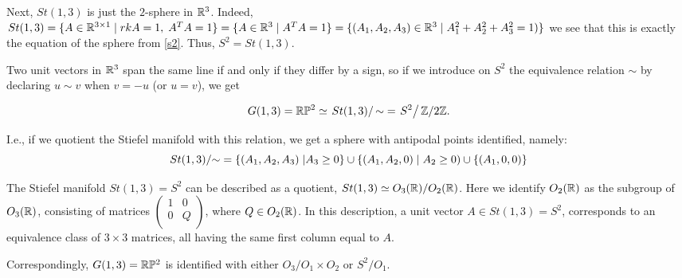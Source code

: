 \documentclass[11pt,a4paper]{report}
\begin{document}
      Next, $St(1,3)$ is just the $2$-sphere in $\mathbb{R}^3$.
%
%
%
      Indeed, $St(1,3) = \{ A \in \mathbb{R}^{3 \times 1} \; | \; rkA=1, \; A^T A = 1 \} = \{ A \in \mathbb{R}^3 \; | \; A^T A = 1 \} = 
\{ (A_1, A_2, A_3) \in \mathbb{R}^3 \; | \; A_1^2 + A_2^2 + A_3^2 = 1) \} $ 
we see that this is exactly the equation of the sphere from \ref{s2}. Thus, $S^2=St(1,3)$.


      Two unit vectors in $\mathbb{R}^3$ span the same line if and only if they differ by a sign, so if we introduce on $S^2$
      the equivalence relation $\sim$ by declaring $u\sim v$ when $v=-u$ (or $u=v$), we get
      
      \[
      	 G(1,3)= \mathbb{R}\mathbb{P}^2 \simeq \left. St(1,3)\right/{\sim}= \left. S^2\right/{\mathbb{Z}/2\mathbb{Z}}.
      \]

      
I.e., if we quotient the Stiefel manifold with this relation, we get a sphere with antipodal points identified, namely: 
$$ St(1,3)/{\sim} = \{ (A_1, A_2, A_3) \; | A_3 \geq 0 \} \cup \{ (A_1, A_2, 0) \; | \; A_2 \geq 0) \cup \{ (A_1, 0, 0) \}  $$

	
	The Stiefel manifold $St(1,3)=S^2$ can be described as a quotient, $St(1,3)\simeq O_3(\mathbb{R})/O_2(\mathbb{R})$. Here
	we identify $O_2(\mathbb{R})$ as the subgroup of $O_3(\mathbb{R})$, consisting of matrices $\begin{pmatrix}
	                                                                               	1&0\\
	                                                                               	0&Q\\
	                                                                               \end{pmatrix}$,
	where $Q\in O_2(\mathbb{R})$. In this description, a unit vector $A\in St(1,3)=S^2$, 
	corresponds to an equivalence class of $3\times 3$ matrices, all having the same first column equal to $A$.
	
	Correspondingly, $G(1,3)=\mathbb{R}\mathbb{P}^2$ is identified with either $O_3/O_1\times O_2$ or $S^2/O_1$.



\newline
\end{document}
